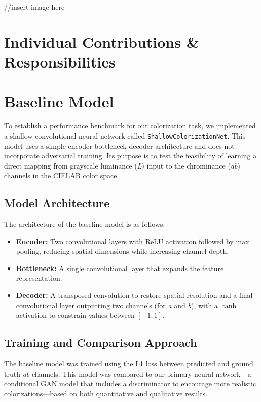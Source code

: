 \documentclass{article} %
\begin{document}
//insert image here



\section{Individual Contributions \& Responsibilities}



\section{Baseline Model}

To establish a performance benchmark for our colorization task, we implemented a shallow convolutional neural network called \texttt{ShallowColorizationNet}. This model uses a simple 
encoder-bottleneck-decoder architecture and does not incorporate adversarial training. Its purpose is to test the feasibility of learning a direct mapping from grayscale luminance (\textit{L}) 
input to the chrominance (\textit{ab}) channels in the CIELAB color space.

\subsection{Model Architecture}

The architecture of the baseline model is as follows:
\begin{itemize}
    \item \textbf{Encoder:} Two convolutional layers with ReLU activation followed by max pooling, reducing spatial dimensions while increasing channel depth.
    \item \textbf{Bottleneck:} A single convolutional layer that expands the feature representation.
    \item \textbf{Decoder:} A transposed convolution to restore spatial resolution and a final convolutional layer outputting two channels (for \textit{a} and \textit{b}), with a $\tanh$ 
    activation to constrain values between $[-1, 1]$.
\end{itemize}

\subsection{Training and Comparison Approach}

The baseline model was trained using the L1 loss between predicted and ground truth \textit{ab} channels. This model was compared to our primary neural network—a conditional 
GAN model that includes a discriminator to encourage more realistic colorizations—based on both quantitative and qualitative results.
\end{document}
